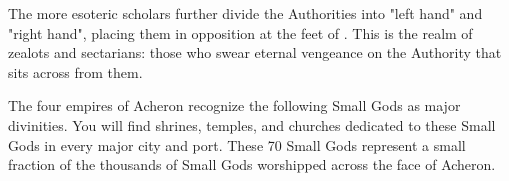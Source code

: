 {\begin{multicols*}{2}

\cbreak



\end{multicols*}

\newpage




The more esoteric scholars further divide the Authorities into "left hand" and "right hand", placing them in opposition at the feet of \TheAuthority.  This is the realm of zealots and sectarians: those who swear eternal vengeance on the Authority that sits across from them.



The four empires of Acheron recognize the following Small Gods as major divinities.  You will find shrines, temples, and churches dedicated to these Small Gods in every major city and port.  These 70 Small Gods represent a small fraction of the thousands of Small Gods worshipped across the face of Acheron. 


\begin{multicols*}{2}
\raggedcolumns



\end{multicols*}}
